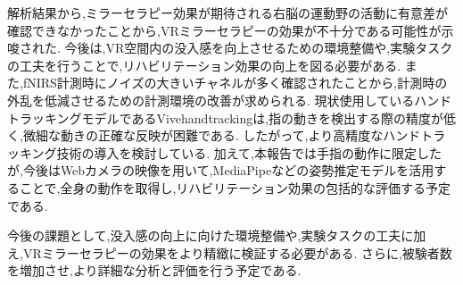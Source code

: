 解析結果から,ミラーセラピー効果が期待される右脳の運動野の活動に有意差が確認できなかったことから,VRミラーセラピーの効果が不十分である可能性が示唆された.
今後は,VR空間内の没入感を向上させるための環境整備や,実験タスクの工夫を行うことで,リハビリテーション効果の向上を図る必要がある.
また,fNIRS計測時にノイズの大きいチャネルが多く確認されたことから,計測時の外乱を低減させるための計測環境の改善が求められる.
現状使用しているハンドトラッキングモデルであるVivehandtrackingは,指の動きを検出する際の精度が低く,微細な動きの正確な反映が困難である.
したがって,より高精度なハンドトラッキング技術の導入を検討している.
加えて,本報告では手指の動作に限定したが,今後はWebカメラの映像を用いて,MediaPipeなどの姿勢推定モデルを活用することで,全身の動作を取得し,リハビリテーション効果の包括的な評価する予定である.

今後の課題として,没入感の向上に向けた環境整備や,実験タスクの工夫に加え,VRミラーセラピーの効果をより精緻に検証する必要がある.
さらに,被験者数を増加させ,より詳細な分析と評価を行う予定である.
